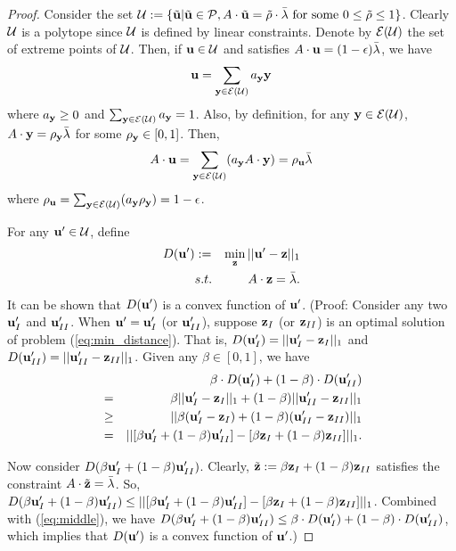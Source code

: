 \documentclass{IEEEtran}
\begin{document}
\begin{proof}
Consider the set ${\cal U}:=\{\tilde{{\bf u}}|\tilde{{\bf u}}\in{\cal P},A\cdot\tilde{{\bf u}}=\tilde{\rho}\cdot\bar{{\bf \lambda}}\text{ for some }0\le\tilde{\rho}\le1\}$.
Clearly ${\cal U}$ is a polytope since ${\cal U}$ is defined by
linear constraints. Denote by ${\cal E}({\cal U})$ the set of extreme
points of ${\cal U}$. Then, if ${\bf u}\in{\cal U}$ and satisfies
$A\cdot{\bf u}=(1-\epsilon)\bar{{\bf \lambda}}$, we have \begin{equation}
{\bf u}=\sum_{{\bf y}\in{\cal E}({\cal U})}a_{{\bf y}}{\bf y}\label{eq:u-combination}\end{equation}
where $a_{{\bf y}}\ge0$ and $\sum_{{\bf y}\in{\cal E}({\cal U})}a_{{\bf y}}=1$.
Also, by definition, for any ${\bf y}\in{\cal E}({\cal U})$, $A\cdot{\bf y}=\rho_{{\bf y}}\bar{{\bf \lambda}}$
for some $\rho_{{\bf y}}\in[0,1]$. Then,\[
A\cdot{\bf u}=\sum_{{\bf y}\in{\cal E}({\cal U})}(a_{{\bf y}}A\cdot{\bf y})=\rho_{{\bf u}}\bar{{\bf \lambda}}\]
where $\rho_{{\bf u}}=\sum_{{\bf y}\in{\cal E}({\cal U})}(a_{{\bf y}}\rho_{{\bf y}})=1-\epsilon$.

For any ${\bf u}'\in{\cal U}$, define\begin{eqnarray}
D({\bf u}') & := & \min_{{\bf z}}||{\bf u}'-{\bf z}||_{1}\nonumber \\
 & s.t. & A\cdot{\bf z}=\bar{{\bf \lambda}}.\label{eq:min_distance}\end{eqnarray}
It can be shown that $D({\bf u}')$ is a convex function of ${\bf u}'$.
(Proof: Consider any two ${\bf u}'_{I}$ and ${\bf u}'_{II}$. When
${\bf u}'={\bf u}'_{I}$ (or ${\bf u}'_{II}$), suppose ${\bf z}_{I}$
(or ${\bf z}_{II}$) is an optimal solution of problem (\ref{eq:min_distance}).
That is, $D({\bf u}'_{I})=||{\bf u}'_{I}-{\bf z}_{I}||_{1}$ and $D({\bf u}'_{II})=||{\bf u}'_{II}-{\bf z}_{II}||_{1}$.
Given any $\beta\in[0,1]$, we have \begin{eqnarray}
 &  & \beta\cdot D({\bf u}'_{I})+(1-\beta)\cdot D({\bf u}'_{II})\nonumber \\
 & = & \beta||{\bf u}'_{I}-{\bf z}_{I}||_{1}+(1-\beta)||{\bf u}'_{II}-{\bf z}_{II}||_{1}\nonumber \\
 & \ge & ||\beta({\bf u}'_{I}-{\bf z}_{I})+(1-\beta)({\bf u}'_{II}-{\bf z}_{II})||_{1}\nonumber \\
 & = & ||[\beta{\bf u}'_{I}+(1-\beta){\bf u}'_{II}]-[\beta{\bf z}_{I}+(1-\beta){\bf z}_{II}]||_{1}.\label{eq:middle}\end{eqnarray}


Now consider $D(\beta{\bf u}'_{I}+(1-\beta){\bf u}'_{II})$. Clearly,
$\tilde{{\bf z}}:=\beta{\bf z}_{I}+(1-\beta){\bf z}_{II}$ satisfies
the constraint $A\cdot\tilde{{\bf z}}=\bar{{\bf \lambda}}$. So, $D(\beta{\bf u}'_{I}+(1-\beta){\bf u}'_{II})\le||[\beta{\bf u}'_{I}+(1-\beta){\bf u}'_{II}]-[\beta{\bf z}_{I}+(1-\beta){\bf z}_{II}]||_{1}$.
Combined with (\ref{eq:middle}), we have $D(\beta{\bf u}'_{I}+(1-\beta){\bf u}'_{II})\le\beta\cdot D({\bf u}'_{I})+(1-\beta)\cdot D({\bf u}'_{II})$,
which implies that $D({\bf u}')$ is a convex function of ${\bf u}'$.)


\end{proof}
\end{document}

